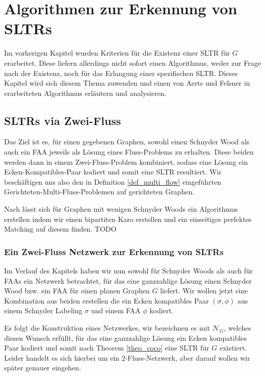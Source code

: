 \chapter{Algorithmen zur Erkennung von SLTRs}\label{main_algo}

Im vorherigen Kapitel wurden Kriterien für die Existenz einer SLTR für $G$ erarbeitet. Diese liefern allerdings nicht sofort einen Algorithmus, weder zur Frage nach der Existenz, noch für das Erlangung einer spezifischen SLTR. Dieses Kapitel wird sich diesem Thema zuwenden und einen von Aerts und Felsner in \cite{af15} erarbeiteten Algorithmus erläutern und analysieren.

\section{SLTRs via Zwei-Fluss}

Das Ziel ist es, für einen gegebenen Graphen, sowohl einen Schnyder Wood als auch ein FAA jeweils als Lösung eines Fluss-Problems zu erhalten. Diese beiden werden dann in einem Zwei-Fluss-Problem kombiniert, sodass eine Lösung ein Ecken-Kompatibles-Paar kodiert und somit eine SLTR resultiert. Wir beschäftigen uns also den in Definition \ref{def_multi_flow} eingeführten Gerichteten-Multi-Fluss-Problemen auf gerichteten Graphen.



\begin{remark}

Nach \cite{af15} lässt sich für Graphen mit wenigen Schnyder Woods ein Algorithmus erstellen indem wir einen bipartiten Karo erstellen und ein einseitiges perfektes Matching auf diesem finden. TODO

\end{remark}

\subsection{Ein Zwei-Fluss Netzwerk zur Erkennung von SLTRs}

Im Verlauf des Kapitels haben wir nun sowohl für Schnyder Woods als auch für FAAs ein Netzwerk betrachtet, für das eine ganzzahlige Lösung einen Schnyder Wood bzw. ein FAA für einen planen Graphen $G$ liefert. Wir wollen jetzt eine Kombination aus beiden erstellen die ein Ecken kompatibles Paar $(\sigma,\phi)$ aus einem Schnyder Labeling $\sigma$ und einem FAA $\phi$  kodiert.\

Es folgt die Konstruktion eines Netzwerkes, wir bezeichnen es mit $\mathcal{N}_G$, welches diesen Wunsch erfüllt, für das eine ganzzahlige Lösung ein Ecken kompatibles Paar kodiert und somit nach Theorem \ref{theo_coco} eine SLTR für $G$ existiert. Leider handelt es sich hierbei um ein 2-Fluss-Netzwerk, aber darauf wollen wir später genauer eingehen.\\

